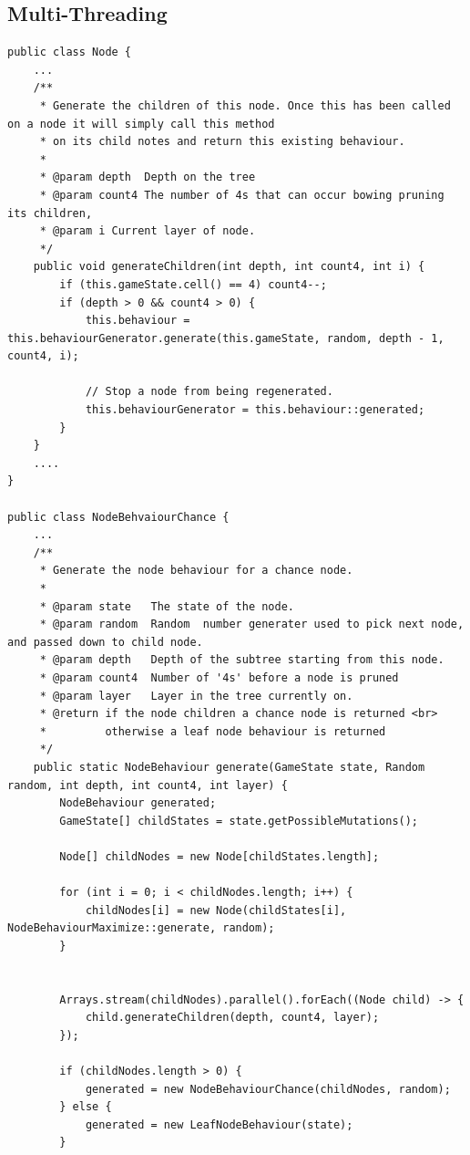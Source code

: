 \documentclass{article}
\begin{document}
\subsection{Multi-Threading}
\label{subsec:apendixmulti}
\begin{verbatim}
public class Node {
    ...
    /**
     * Generate the children of this node. Once this has been called on a node it will simply call this method
     * on its child notes and return this existing behaviour.
     *
     * @param depth  Depth on the tree
     * @param count4 The number of 4s that can occur bowing pruning its children,
     * @param i Current layer of node.
     */
    public void generateChildren(int depth, int count4, int i) {
        if (this.gameState.cell() == 4) count4--;
        if (depth > 0 && count4 > 0) {
            this.behaviour = this.behaviourGenerator.generate(this.gameState, random, depth - 1, count4, i);

            // Stop a node from being regenerated.
            this.behaviourGenerator = this.behaviour::generated;
        }
    }
    ....
}

public class NodeBehvaiourChance {
    ...
    /**
     * Generate the node behaviour for a chance node.
     *
     * @param state   The state of the node.
     * @param random  Random  number generater used to pick next node, and passed down to child node.
     * @param depth   Depth of the subtree starting from this node.
     * @param count4  Number of '4s' before a node is pruned
     * @param layer   Layer in the tree currently on.
     * @return if the node children a chance node is returned <br>
     *         otherwise a leaf node behaviour is returned
     */
    public static NodeBehaviour generate(GameState state, Random random, int depth, int count4, int layer) {
        NodeBehaviour generated;
        GameState[] childStates = state.getPossibleMutations();

        Node[] childNodes = new Node[childStates.length];

        for (int i = 0; i < childNodes.length; i++) {
            childNodes[i] = new Node(childStates[i], NodeBehaviourMaximize::generate, random);
        }


        Arrays.stream(childNodes).parallel().forEach((Node child) -> {
            child.generateChildren(depth, count4, layer);
        });

        if (childNodes.length > 0) {
            generated = new NodeBehaviourChance(childNodes, random);
        } else {
            generated = new LeafNodeBehaviour(state);
        }



\end{verbatim}
\end{document}

